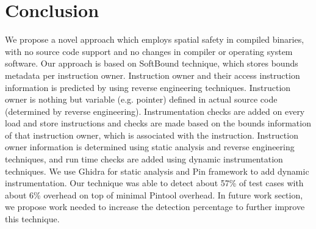 
\chapter{Conclusion}

We propose a novel approach which employs spatial safety in compiled binaries, with no source code support and no changes in compiler or operating system software. Our approach is based on SoftBound technique, which stores bounds metadata per instruction owner. Instruction owner and their access instruction information is predicted by using reverse engineering techniques. Instruction owner is nothing but variable (e.g. pointer) defined in actual source code (determined by reverse engineering). Instrumentation checks are added on every load and store instructions and checks are made based on the bounds information of that instruction owner, which is associated with the instruction. Instruction owner information is determined using static analysis and reverse engineering techniques, and run time checks are added using dynamic instrumentation techniques. We use Ghidra for static analysis and Pin framework to add dynamic instrumentation. Our technique was able to detect about 57\% of test cases with about 6\% overhead on top of minimal Pintool overhead. In future work section, we propose work needed to increase the detection percentage to further improve this technique.